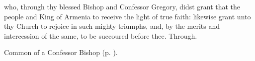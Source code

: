 
\memorialCollect\label{ArmeniaCollect}
 who, through thy blessed Bishop and Confessor Gregory, didst grant that the people and King of Armenia to receive the light of true faith: likewise grant unto thy Church to rejoice in such mighty triumphs, and, by the merits and intercession of the same, to be succoured before thee. Through.



\begin{rubric}
	Common of a Confessor Bishop (p. \pageref{ConfessorBishopCollect}).
\end{rubric}



